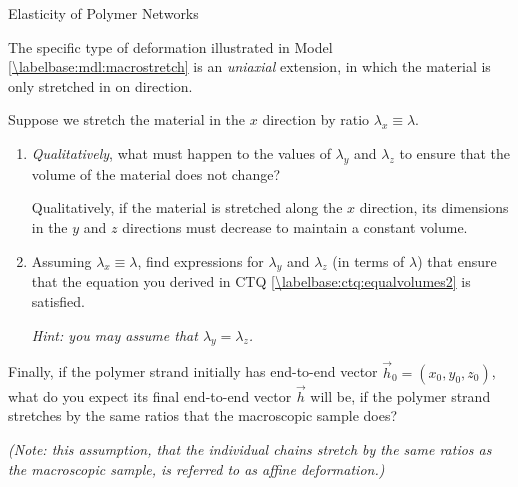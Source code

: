 \begin{activity}{Elasticity of Polymer Networks}
\begin{ctqs}
\begin{enumerate}
		\end{enumerate}
		
	\question The specific type of deformation illustrated in Model \ref{\labelbase:mdl:macrostretch} is an \emph{uniaxial} extension, in which the material is only stretched in on direction.
	
		Suppose we stretch the material in the $x$ direction by ratio $\lambda_x \equiv \lambda$.  
		
			\begin{enumerate}
				\item \emph{Qualitatively}, what must happen to the values of $\lambda_y$ and $\lambda_z$ to ensure that the volume of the material does not change?
				
					\begin{solution}[1in]
						Qualitatively, if the material is stretched along the $x$ direction, its dimensions in the $y$ and $z$ directions must decrease to maintain a constant volume.
					\end{solution}
				
				\item Assuming $\lambda_x \equiv \lambda$, find expressions for $\lambda_y$ and $\lambda_z$ (in terms of $\lambda$) that ensure that the equation you derived in CTQ \ref{\labelbase:ctq:equalvolumes2} is satisfied.
		
				\emph{Hint: you may assume that $\lambda_y = \lambda_z$.}
				
					\begin{solution}[1.5in]\end{solution}
				
			\end{enumerate}
	
	\question Finally, if the polymer strand initially has end-to-end vector $\vec h_0 = (x_0, y_0, z_0)$, what do you expect its final end-to-end vector $\vec h$ will be, if the polymer strand stretches by the same ratios that the macroscopic sample does?  \label{\labelbase:ctq:affinedef}
			
			\emph{(Note: this assumption, that the individual chains stretch by the same ratios as the macroscopic sample, is referred to as \emph{affine deformation}.)}
		

\end{ctqs}
\end{activity}
